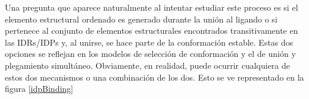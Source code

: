 Una pregunta que aparece naturalmente al intentar estudiar este proceso es si el elemento estructural ordenado es generado durante la unión al ligando 
o si pertenece al conjunto de elementos estructurales encontrados transitivamente en las IDRs/IDPs y, al unirse, se hace parte de la conformación estable.
Estas dos opciones se reflejan en los modelos de selección de conformación y el de unión y plegamiento simultáneo.
% 
Obviamente, en realidad, puede ocurrir cualquiera de estos dos mecanismos o una combinación de los dos.
Esto se ve representado en la figura \ref{idpBinding}



